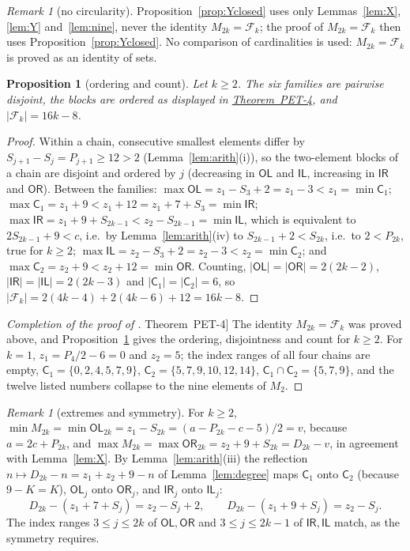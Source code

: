 \documentclass[11pt]{amsart}
\newtheorem{proposition}[lemma]{Proposition}
\theoremstyle{definition}
\theoremstyle{remark}
\newtheorem{remark}[lemma]{Remark}
\theoremstyle{plain}
\numberwithin{equation}{section}
\newcommand{\CC}{\mathsf{C}}
\newcommand{\OL}{\mathsf{OL}}
\newcommand{\OR}{\mathsf{OR}}
\newcommand{\IL}{\mathsf{IL}}
\newcommand{\IR}{\mathsf{IR}}
\newcommand{\Fam}{\mathcal{F}}
\newcommand{\PETfour}{\hyperref[thm:pet4]{Theorem~PET-4}}
\begin{document}
\begin{remark}[no circularity]\label{rem:noncirc4}
Proposition~\ref{prop:Yclosed} uses only Lemmas~\ref{lem:X}, \ref{lem:Y} and~\ref{lem:nine}, never
the identity $M_{2k}=\Fam_k$; the proof of $M_{2k}=\Fam_k$ then uses
Proposition~\ref{prop:Yclosed}. No comparison of cardinalities is used: $M_{2k}=\Fam_k$ is proved as
an identity of sets.
\end{remark}

\begin{proposition}[ordering and count]\label{prop:order}
Let $k\ge2$. The six families are pairwise disjoint, the blocks are ordered as displayed in
\PETfour, and $|\Fam_k|=16k-8$.
\end{proposition}

\begin{proof}
Within a chain, consecutive smallest elements differ by $S_{j+1}-S_j=P_{j+1}\ge12>2$
(Lemma~\ref{lem:arith}(i)), so the two-element blocks of a chain are disjoint and ordered by $j$
(decreasing in $\OL$ and $\IL$, increasing in $\IR$ and $\OR$). Between the families:
$\max\OL=z_1-S_3+2=z_1-3<z_1=\min\CC_1$; $\max\CC_1=z_1+9<z_1+12=z_1+7+S_3=\min\IR$;
$\max\IR=z_1+9+S_{2k-1}<z_2-S_{2k-1}=\min\IL$, which is equivalent to $2S_{2k-1}+9<c$, i.e.\ by
Lemma~\ref{lem:arith}(iv) to $S_{2k-1}+2<S_{2k}$, i.e.\ to $2<P_{2k}$, true for $k\ge2$;
$\max\IL=z_2-S_3+2=z_2-3<z_2=\min\CC_2$; and $\max\CC_2=z_2+9<z_2+12=\min\OR$. Counting,
$|\OL|=|\OR|=2(2k-2)$, $|\IR|=|\IL|=2(2k-3)$ and $|\CC_1|=|\CC_2|=6$, so
$|\Fam_k|=2(4k-4)+2(4k-6)+12=16k-8$.
\end{proof}

\begin{proof}[Completion of the proof of \PETfour]
The identity $M_{2k}=\Fam_k$ was proved above, and Proposition~\ref{prop:order} gives the ordering,
disjointness and count for $k\ge2$. For $k=1$, $z_1=P_4/2-6=0$ and $z_2=5$; the index ranges of all
four chains are empty, $\CC_1=\{0,2,4,5,7,9\}$, $\CC_2=\{5,7,9,10,12,14\}$, $\CC_1\cap\CC_2=\{5,7,9\}$,
and the twelve listed numbers collapse to the nine elements of $M_2$.
\end{proof}

\begin{remark}[extremes and symmetry]\label{rem:symmetry4}
For $k\ge2$, $\min M_{2k}=\min\OL_{2k}=z_1-S_{2k}=(a-P_{2k}-c-5)/2=v$, because $a=2c+P_{2k}$, and
$\max M_{2k}=\max\OR_{2k}=z_2+9+S_{2k}=D_{2k}-v$, in agreement with Lemma~\ref{lem:X}. By
Lemma~\ref{lem:arith}(iii) the reflection $n\mapsto D_{2k}-n=z_1+z_2+9-n$ of Lemma~\ref{lem:degree}
maps $\CC_1$ onto $\CC_2$ (because $9-K=K$), $\OL_j$ onto $\OR_j$, and $\IR_j$ onto $\IL_j$:
\[
D_{2k}-(z_1+7+S_j)=z_2-S_j+2,\qquad D_{2k}-(z_1+9+S_j)=z_2-S_j .
\]
The index ranges $3\le j\le2k$ of $\OL,\OR$ and $3\le j\le2k-1$ of $\IR,\IL$ match, as the symmetry
requires.
\end{remark}
\end{document}
